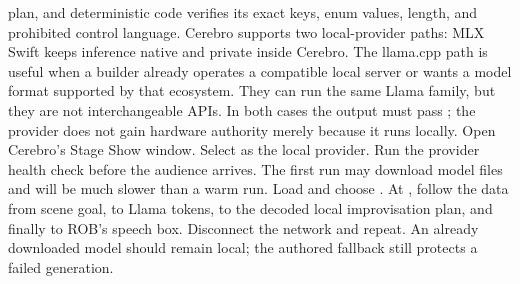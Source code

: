 {}plan, and deterministic code verifies its exact keys, enum values, length, and\markdownRendererSoftLineBreak
{}prohibited control language.\markdownRendererInterblockSeparator
{}
\markdownRendererSectionEnd \markdownRendererSectionBegin
{}\markdownRendererInterblockSeparator
{}Cerebro supports two local-provider paths:\markdownRendererInterblockSeparator
{}\markdownRendererInterblockSeparator
{}MLX Swift keeps inference native and private inside Cerebro. The llama.cpp\markdownRendererSoftLineBreak
{}path is useful when a builder already operates a compatible local server or\markdownRendererSoftLineBreak
{}wants a model format supported by that ecosystem. They can run the same Llama\markdownRendererSoftLineBreak
{}family, but they are not interchangeable APIs. In both cases the output must\markdownRendererSoftLineBreak
{}pass ; the provider does not gain hardware\markdownRendererSoftLineBreak
{}authority merely because it runs locally.\markdownRendererInterblockSeparator
{}
\markdownRendererSectionEnd \markdownRendererSectionBegin
{}\markdownRendererInterblockSeparator
{}\markdownRendererOlBegin
{}Open Cerebro's Stage Show window.\markdownRendererOlItemEnd 
{}Select  as the local provider.\markdownRendererOlItemEnd 
{}Run the provider health check before the audience arrives. The first run\markdownRendererSoftLineBreak
{}may download model files and will be much slower than a warm run.\markdownRendererOlItemEnd 
{}Load  and choose .\markdownRendererOlItemEnd 
{}At , follow the data from scene goal, to Llama tokens, to the\markdownRendererSoftLineBreak
{}decoded local improvisation plan, and finally to ROB's speech box.\markdownRendererOlItemEnd 
{}Disconnect the network and repeat. An already downloaded model should\markdownRendererSoftLineBreak
{}remain local; the authored fallback still protects a failed generation.\markdownRendererOlItemEnd 

